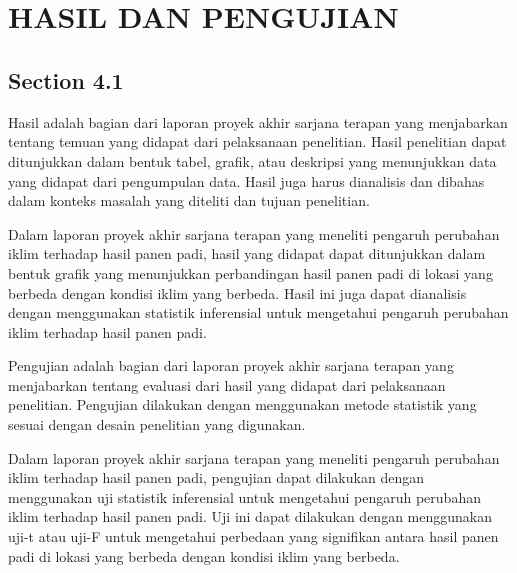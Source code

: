 
\chapter[HASIL DAN PENGUJIAN]{\\ HASIL DAN PENGUJIAN}

\section{Section 4.1}
Hasil adalah bagian dari laporan proyek akhir sarjana terapan yang menjabarkan tentang temuan yang didapat dari pelaksanaan penelitian. Hasil penelitian dapat ditunjukkan dalam bentuk tabel, grafik, atau deskripsi yang menunjukkan data yang didapat dari pengumpulan data. Hasil juga harus dianalisis dan dibahas dalam konteks masalah yang diteliti dan tujuan penelitian.

Dalam laporan proyek akhir sarjana terapan yang meneliti pengaruh perubahan iklim terhadap hasil panen padi, hasil yang didapat dapat ditunjukkan dalam bentuk grafik yang menunjukkan perbandingan hasil panen padi di lokasi yang berbeda dengan kondisi iklim yang berbeda. Hasil ini juga dapat dianalisis dengan menggunakan statistik inferensial untuk mengetahui pengaruh perubahan iklim terhadap hasil panen padi.

Pengujian adalah bagian dari laporan proyek akhir sarjana terapan yang menjabarkan tentang evaluasi dari hasil yang didapat dari pelaksanaan penelitian. Pengujian dilakukan dengan menggunakan metode statistik yang sesuai dengan desain penelitian yang digunakan.

Dalam laporan proyek akhir sarjana terapan yang meneliti pengaruh perubahan iklim terhadap hasil panen padi, pengujian dapat dilakukan dengan menggunakan uji statistik inferensial untuk mengetahui pengaruh perubahan iklim terhadap hasil panen padi. Uji ini dapat dilakukan dengan menggunakan uji-t atau uji-F untuk mengetahui perbedaan yang signifikan antara hasil panen padi di lokasi yang berbeda dengan kondisi iklim yang berbeda.

